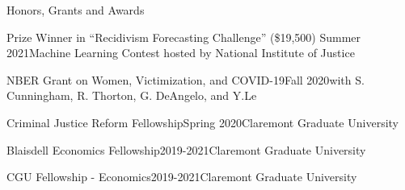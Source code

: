 \documentclass{resume} %
\begin{document}
\begin{rSection}{Honors, Grants and Awards}

\begin{rSubsection}{Prize Winner in “Recidivism Forecasting Challenge” (\$19,500) }{Summer 2021}{Machine Learning Contest hosted by National Institute of Justice}{}



\vspace{-1cm}
\item[]
\end{rSubsection}

\begin{rSubsection}{NBER Grant on Women, Victimization, and COVID-19}{Fall 2020}{with S. Cunningham, R. Thorton, G. DeAngelo, and Y.Le}{}



\vspace{-1cm}
\item[]
\end{rSubsection}
\begin{rSubsection}{Criminal Justice Reform Fellowship}{Spring 2020}{Claremont Graduate University}{}



\vspace{-1cm}
\item[]
\end{rSubsection}

\begin{rSubsection}{Blaisdell Economics Fellowship}{2019-2021}{Claremont Graduate University}{}



\vspace{-1cm}
\item[]
\end{rSubsection}

\begin{rSubsection}{CGU Fellowship - Economics}{2019-2021}{Claremont Graduate University}{}



\vspace{-1cm}
\item[]
\end{rSubsection}



\end{rSection}
\end{document}
